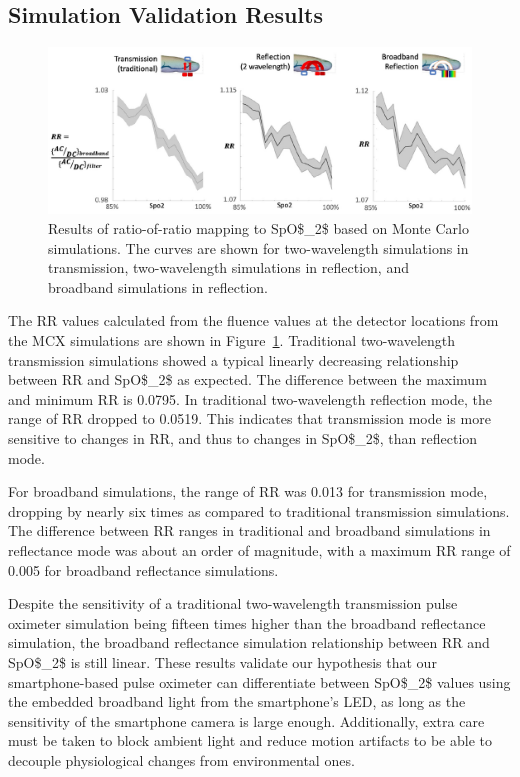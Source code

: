 \subsection{Simulation Validation Results}
\begin{figure}
    \begin{center}
    \includegraphics[width=\textwidth]{fig/moxi/D3RR.pdf}
    \end{center}
    \caption{Results of ratio-of-ratio mapping to \ac{SpO$_2$} based on Monte Carlo simulations. The curves are shown for two-wavelength simulations in transmission, two-wavelength simulations in reflection, and broadband simulations in reflection.} 
    \label{fig:D3RR}
\end{figure}
The \ac{RR} values calculated from the fluence values at the detector locations from the \ac{MCX} simulations are shown in Figure~\ref{fig:D3RR}. Traditional two-wavelength transmission simulations showed a typical linearly decreasing relationship between \ac{RR} and \ac{SpO$_2$} as expected. The difference between the maximum and minimum \ac{RR} is 0.0795. In traditional two-wavelength reflection mode, the range of \ac{RR} dropped to 0.0519. This indicates that transmission mode is more sensitive to changes in \ac{RR}, and thus to changes in \ac{SpO$_2$}, than reflection mode. 

For broadband simulations, the range of \ac{RR} was 0.013 for transmission mode, dropping by nearly six times as compared to traditional transmission simulations. The difference between \ac{RR} ranges in traditional and broadband simulations in reflectance mode was about an order of magnitude, with a maximum \ac{RR} range of 0.005 for broadband reflectance simulations. 

Despite the sensitivity of a traditional two-wavelength transmission pulse oximeter simulation being fifteen times higher than the broadband reflectance simulation, the broadband reflectance simulation relationship between \ac{RR} and \ac{SpO$_2$} is still linear. These results validate our hypothesis that our smartphone-based pulse oximeter can differentiate between \ac{SpO$_2$} values using the embedded broadband light from the smartphone's \ac{LED}, as long as the sensitivity of the smartphone camera is large enough. Additionally, extra care must be taken to block ambient light and reduce motion artifacts to be able to decouple physiological changes from environmental ones. 

